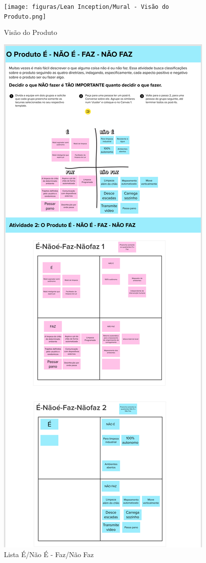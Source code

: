 \begin{anexosenv}

\partanexos

 \begin{figure}[H]
\centering
\texttt{[image: figuras/Lean Inception/Mural - Visão do Produto.png]}
\caption{Visão do Produto}
\label{visao do produto}
\end{figure}

\begin{figure}[H]
\centering
\includegraphics[height=\textheight]{figuras/Lean Inception/Mural - É, Não é, Faz, Não faz.png}
\caption{Lista É/Não É - Faz/Não Faz}
\label{lista e nao e}
\end{figure}


\end{anexosenv}
